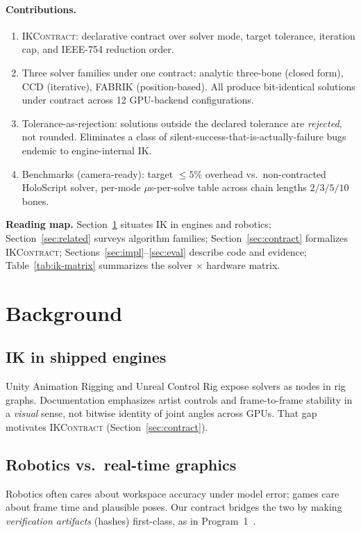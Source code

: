 \documentclass[sigconf,nonacm]{acmart}
\newcommand{\ikcontract}{\textsc{IKContract}}
\newcommand{\fabrik}{\textsc{FABRIK}}
\newcommand{\ccd}{\textsc{CCD}}
\begin{document}
\paragraph{Contributions.}
\begin{enumerate}
  \item \ikcontract{}: declarative contract over solver mode, target
    tolerance, iteration cap, and IEEE-754 reduction order.
  \item Three solver families under one contract: analytic three-bone
    (closed form), \ccd{} (iterative), \fabrik{} (position-based).
    All produce bit-identical solutions under contract across 12
    GPU-backend configurations.
  \item Tolerance-as-rejection: solutions outside the declared
    tolerance are \emph{rejected}, not rounded. Eliminates a class
    of silent-success-that-is-actually-failure bugs endemic to
    engine-internal IK.
  \item Benchmarks (camera-ready): target $\leq 5\%$ overhead vs.\
    non-contracted HoloScript solver, per-mode $\mu$s-per-solve table
    across chain lengths $2/3/5/10$ bones.
\end{enumerate}

\noindent\textbf{Reading map.}
Section~\ref{sec:bg} situates IK in engines and robotics;
Section~\ref{sec:related} surveys algorithm families;
Section~\ref{sec:contract} formalizes \ikcontract{};
Sections~\ref{sec:impl}--\ref{sec:eval} describe code and evidence;
Table~\ref{tab:ik-matrix} summarizes the solver $\times$ hardware matrix.

\section{Background}
\label{sec:bg}

\subsection{IK in shipped engines}
Unity Animation Rigging and Unreal Control Rig expose solvers as nodes in
rig graphs. Documentation emphasizes artist controls and frame-to-frame
stability in a \emph{visual} sense, not bitwise identity of joint angles
across GPUs. That gap motivates \ikcontract{} (Section~\ref{sec:contract}).

\subsection{Robotics vs.\ real-time graphics}
Robotics often cares about workspace accuracy under model error; games care
about frame time and plausible poses. Our contract bridges the two by making
\emph{verification artifacts} (hashes) first-class, as in
Program~1~\cite{trustbyconstruction2026}.
\end{document}
